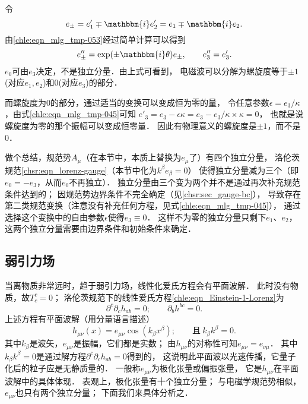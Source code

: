 令
\begin{equation}\label{chle:eqn_mlg_tmp-058}
    e_{\pm} =  e'_1 \mp  \mathbbm{i} e'_2 =e_1 \mp  \mathbbm{i} e_2 .
\end{equation}
由\eqref{chle:eqn_mlg_tmp-053}经过简单计算可以得到
\begin{equation}\label{chle:eqn_mlg_tmp-060}
    e''_{\pm} =\exp(\pm \mathbbm{i}\theta) e_{\pm} , \qquad e''_3 =  e'_3 .
\end{equation}
$e_0$可由$e_3$决定，不是独立分量．由上式可看到，
电磁波可以分解为螺旋度等于$\pm 1$(对应$e_1,e_2$)和0(对应$e_3$)的部分．

而螺旋度为0的部分，通过适当的变换可以变成恒为零的量，
令任意参数$\epsilon=e_3/\kappa$，由式\eqref{chle:eqn_mlg_tmp-045}可知
$e'_3 =  e_3 - \epsilon \kappa =  e_3 -e_3/\kappa\times \kappa=0$，
也就是说螺旋度为零的那个振幅可以变成恒零量．
因此有物理意义的螺旋度是$\pm 1$，而不是0．

做个总结，规范势$A_\mu$（在本节中，本质上替换为$e_\mu$了）有四个独立分量，
洛伦茨规范\eqref{chsr:eqn_lorenz-gauge}（本节中化为$k^\beta e_\beta =0$）
使得独立分量减为三个（即$e_0=-e_3$，从而$e_0$不再独立）．
独立分量由三个变为两个并不是通过再次补充规范条件达到的；
因规范势边界条件不完全确定（见\ref{chsr:sec_gauge-bc}），
导致存在第二类规范变换（注意没有补充任何方程，见式\eqref{chle:eqn_mlg_tmp-045}），
通过选择这个变换中的自由参数$\epsilon$使得$e_3\equiv 0$．
这样不为零的独立分量只剩下$e_1$、$e_2$，
这两个独立分量需要由边界条件和初始条件来确定．










\subsection{弱引力场}
当离物质非常远时，趋于弱引力场，线性化爱氏方程会有平面波解．
此时没有物质，故$T^c_c=0$；
洛伦茨规范下的线性爱氏方程\eqref{chle:eqn_Einstein-1-Lorenz}为
\begin{equation}
    \partial^c\partial_{c} h_{ab}  = 0 ;
    \qquad \partial_b h^{bc}=0.
\end{equation}
上述方程有平面波解（用分量语言描述）
\begin{equation}\label{chle:eqn_plane}
    h_{\mu\nu}(x) = e_{\mu\nu} \cos(k_\beta x^\beta);
      \qquad \text{且}\ k_\beta k^\beta=0 .
\end{equation}
其中$k_\beta$是波矢，$e_{\mu\nu}$是振幅，它们都是实数；
由$h_{\mu\nu}$的对称性可知$e_{\mu\nu}=e_{\nu\mu}$．
其中$k_\beta k^\beta=0$是通过解方程$\partial^c\partial_{c} h_{ab}  = 0$得到的，
这说明此平面波以光速传播，它量子化后的粒子应是无静质量的．
一般称$e_{\mu\nu}$为{\heiti 极化张量}或{\heiti 偏振张量}，
它是$h_{\mu\nu}$在平面波解中的具体体现．
表观上，极化张量有十个独立分量；
与电磁学规范势相似，$e_{\mu\nu}$也只有两个独立分量；
下面我们来具体分析之．


